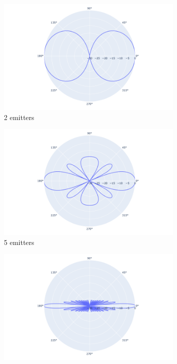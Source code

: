 \begin{figure}[ht]
  \begin{subfigure}[b]{0.32\textwidth}
    \includegraphics[width=\textwidth]{src/assets/pictures/theory/beam_n2_d0.5.png}
    \caption{2 emitters}
    \label{fig:theory:beam:num_2}
  \end{subfigure}
  \hfill
  \begin{subfigure}[b]{0.32\textwidth}
    \includegraphics[width=\textwidth]{src/assets/pictures/theory/beam_n5.png}
    \caption{5 emitters}
    \label{fig:theory:beam:num_5}
  \end{subfigure}
  \hfill
  \begin{subfigure}[b]{0.32\textwidth}
    \includegraphics[width=\textwidth]{src/assets/pictures/theory/beam_n20.png}

\end{subfigure}
\end{figure}
